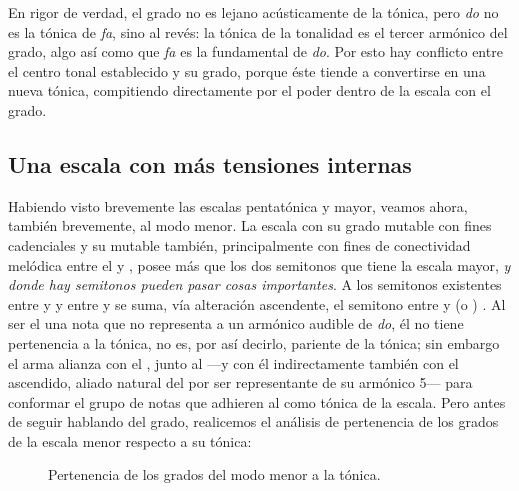 \documentclass[a4paper,10pt]{article}
\begin{document}
\begin{multicols}{2}
    En rigor de verdad, el  grado no es lejano acústicamente de la tónica, pero \emph{do} no es la tónica de \emph{fa}, sino al revés: la tónica de la tonalidad es el tercer armónico del  grado, algo así como que \emph{fa} es la fundamental de \emph{do}. Por esto hay conflicto entre el centro tonal establecido y su  grado, porque éste tiende a convertirse en una nueva tónica, compitiendo directamente por el poder dentro de la escala con el  grado.

    \subsection{Una escala con más tensiones internas}\label{subsec:esc-mas-tensiones}
    Habiendo visto brevemente las escalas pentatónica y mayor, veamos ahora, también brevemente, al modo menor. La escala  con su  grado mutable con fines cadenciales y su  mutable también, principalmente con fines de conectividad melódica entre el  y , posee más que los dos semitonos que tiene la escala mayor, \emph{y donde hay semitonos pueden pasar cosas importantes}. A los semitonos existentes entre  y  y entre  y  se suma, vía alteración ascendente, el semitono entre  y  (o ) \hbox{.} Al ser el  una nota que no representa a un armónico audible de \emph{do}, él no tiene pertenencia a la tónica, no es, por así decirlo, pariente de la tónica; sin embargo el  arma alianza con el , junto al  ---y con él indirectamente también con el  ascendido, aliado natural del  por ser representante de su armónico 5--- para conformar el grupo de notas que adhieren al  como tónica de la escala. Pero antes de seguir hablando del  grado, realicemos el análisis de pertenencia de los grados de la escala menor respecto a su tónica:
\end{multicols}

\begin{figure}[ht]
\centering
{}
\caption{Pertenencia de los grados del modo menor a la tónica.}\label{fig:pertenencia-menor}
\end{figure}
\end{document}
